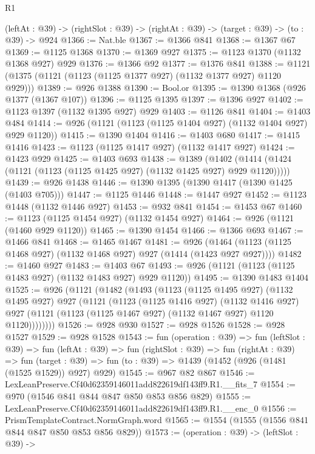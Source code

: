 \begin{lexlean}{R1}
\begin{coremodule}
  (leftAt : @39) -> (rightSlot : @39) -> (rightAt : @39) -> (target : @39) -> (to : @39) -> @924
@1366 := Nat.ble
@1367 := @1366 @841
@1368 := @1367 @67
@1369 := @1125 @1368
@1370 := @1369 @927
@1375 := @1123 @1370 (@1132 @1368 @927) @929
@1376 := @1366 @92
@1377 := @1376 @841
@1388 := @1121 (@1375 (@1121 (@1123 (@1125 @1377 @927) (@1132 @1377 @927) @1120 @929)))
@1389 := @926 @1388
@1390 := Bool.or
@1395 := @1390 @1368 (@926 @1377 (@1367 @107))
@1396 := @1125 @1395
@1397 := @1396 @927
@1402 := @1123 @1397 (@1132 @1395 @927) @929
@1403 := @1126 @841
@1404 := @1403 @484
@1414 := @926 (@1121 (@1123 (@1125 @1404 @927) (@1132 @1404 @927) @929 @1120))
@1415 := @1390 @1404
@1416 := @1403 @680
@1417 := @1415 @1416
@1423 := @1123 (@1125 @1417 @927) (@1132 @1417 @927)
@1424 := @1423 @929
@1425 := @1403 @693
@1438 := @1389
    (@1402 (@1414 (@1424 (@1121 (@1123 (@1125 @1425 @927) (@1132 @1425 @927) @929 @1120)))))
@1439 := @926 @1438
@1446 := @1390 @1395 (@1390 @1417 (@1390 @1425 (@1403 @705)))
@1447 := @1125 @1446
@1448 := @1447 @927
@1452 := @1123 @1448 (@1132 @1446 @927)
@1453 := @932 @841
@1454 := @1453 @67
@1460 := @1123 (@1125 @1454 @927) (@1132 @1454 @927)
@1464 := @926 (@1121 (@1460 @929 @1120))
@1465 := @1390 @1454
@1466 := @1366 @693
@1467 := @1466 @841
@1468 := @1465 @1467
@1481 := @926 (@1464 (@1123 (@1125 @1468 @927) (@1132 @1468 @927) @927 (@1414 (@1423 @927 @927))))
@1482 := @1460 @927
@1483 := @1403 @67
@1493 := @926 (@1121 (@1123 (@1125 @1483 @927) (@1132 @1483 @927) @929 @1120))
@1495 := @1390 @1483 @1404
@1525 := @926
    (@1121
      (@1482
        (@1493
          (@1123
            (@1125 @1495 @927)
            (@1132 @1495 @927)
            @927
            (@1121
              (@1123
                (@1125 @1416 @927)
                (@1132 @1416 @927)
                @927
                (@1121 (@1123 (@1125 @1467 @927) (@1132 @1467 @927) @1120 @1120))))))))
@1526 := @928 @930
@1527 := @928 @1526
@1528 := @928 @1527
@1529 := @928 @1528
@1543 := fun (operation : @39) =>
  fun (leftSlot : @39) =>
  fun (leftAt : @39) =>
  fun (rightSlot : @39) =>
  fun (rightAt : @39) =>
  fun (target : @39) => fun (to : @39) => @1439 (@1452 (@926 (@1481 (@1525 @1529)) @927) @929)
@1545 := @967 @82 @867
@1546 := LexLeanPreserve.Cf40d62359146011add822619df143ff9.R1.__fits_7
@1554 := @970 (@1546 @841 @844 @847 @850 @853 @856 @829)
@1555 := LexLeanPreserve.Cf40d62359146011add822619df143ff9.R1.__enc_0
@1556 := PrismTemplateContract.NormGraph.word
@1565 := @1554 (@1555 (@1556 @841 @844 @847 @850 @853 @856 @829))
@1573 := (operation : @39) ->
  (leftSlot : @39) ->

\end{coremodule}
\end{lexlean}
